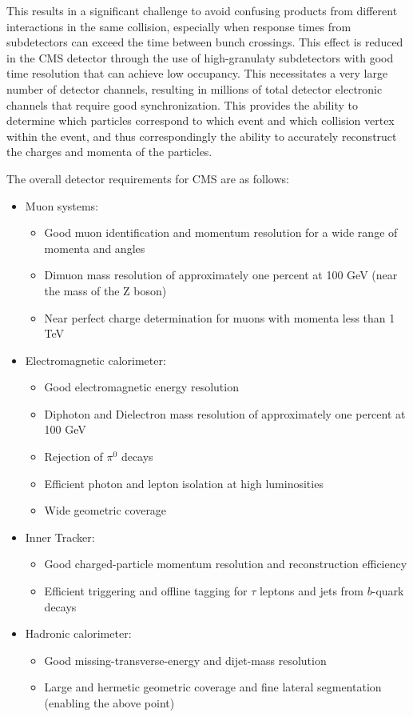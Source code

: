 This results in a significant challenge to avoid confusing products from different interactions in the same collision, especially when response times from subdetectors can exceed the time between bunch crossings.  This effect is reduced in the CMS detector through the use of high-granulaty subdetectors with good time resolution that can achieve low occupancy.  This necessitates a very large number of detector channels, resulting in millions of total detector electronic channels that require good synchronization.  This provides the ability to determine which particles correspond to which event and which collision vertex within the event, and thus correspondingly the ability to accurately reconstruct the charges and momenta of the particles.  

The overall detector requirements for CMS are as follows:

\begin{itemize}

\item Muon systems:
  \begin{itemize}
  \item Good muon identification and momentum resolution for a wide range of momenta and angles
  \item Dimuon mass resolution of approximately one percent at 100 GeV (near the mass of the Z boson)
  \item Near perfect charge determination for muons with momenta less than 1 TeV
  \end{itemize}
\item Electromagnetic calorimeter:
  \begin{itemize}
  \item Good electromagnetic energy resolution
  \item Diphoton and Dielectron mass resolution of approximately one percent at 100 GeV
  \item Rejection of $\pi^0$ decays
  \item Efficient photon and lepton isolation at high luminosities
  \item Wide geometric coverage
  \end{itemize}
\item Inner Tracker:
  \begin{itemize}
  \item Good charged-particle momentum resolution and reconstruction efficiency
  \item Efficient triggering and offline tagging for $\tau$ leptons and jets from $b$-quark decays
  \end{itemize}
  
\item Hadronic calorimeter:
  \begin{itemize}
  \item Good missing-transverse-energy and dijet-mass resolution
  \item Large and hermetic geometric coverage and fine lateral segmentation (enabling the above point)
  \end{itemize}
\end{itemize}

